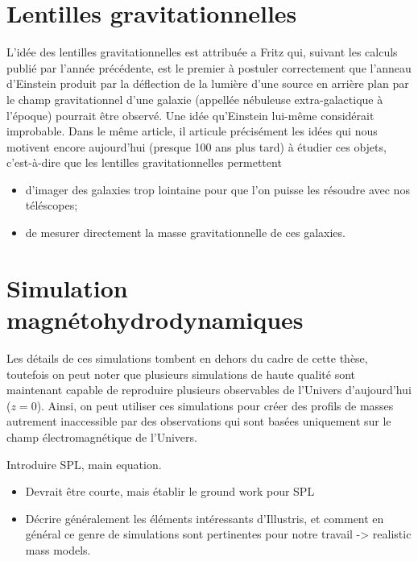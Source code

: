 \section{Lentilles gravitationnelles}\label{sec:lentilles gravitationnelles}

L'idée des lentilles gravitationnelles est attribuée a Fritz \citet{Zwicky1937} %
qui, suivant les calculs publié par \citet{Einstein1936} l'année précédente, %
est le premier à postuler correctement que l'anneau d'Einstein produit par la déflection 
de la lumière d'une source en arrière plan par le champ gravitationnel d'une galaxie 
(appellée nébuleuse extra-galactique à l'époque) 
pourrait être observé. Une idée qu'Einstein lui-même considérait improbable. 
Dans le même article, il articule précisément les idées qui nous motivent encore aujourd'hui 
(presque 100 ans plus tard) à étudier ces objets, 
c'est-à-dire que les lentilles gravitationnelles permettent
\begin{itemize}
        \item d'imager des galaxies trop lointaine pour que l'on puisse les résoudre avec 
                nos téléscopes;
        \item de mesurer directement la masse gravitationnelle de ces galaxies.
\end{itemize}



\section{Simulation magnétohydrodynamiques}\label{sec:simulation magnetohydrodynamique}
Les détails de ces simulations tombent en dehors du cadre de cette thèse, 
toutefois on peut noter que plusieurs simulations de haute qualité sont maintenant 
capable de reproduire plusieurs observables de l'Univers d'aujourd'hui ($z=0$). 
Ainsi, on peut utiliser ces simulations pour créer des profils de masses 
autrement inaccessible par des observations qui sont basées uniquement 
sur le champ électromagnétique de l'Univers.

Introduire SPL, main equation.
\begin{itemize}
        \item Devrait être courte, mais établir le ground work pour 
                SPL
        \item Décrire généralement les éléments intéressants d'Illustris, et
                comment en général ce genre de simulations sont pertinentes 
                pour notre travail -> realistic mass models.
\end{itemize}

